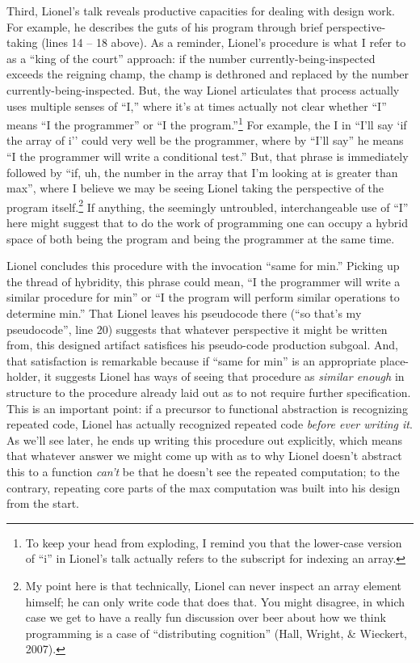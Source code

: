 Third, Lionel's talk reveals productive capacities for dealing with
design work. For example, he describes the guts of his program through
brief perspective-taking (lines 14 -- 18 above). As a reminder, Lionel's
procedure is what I refer to as a ``king of the court'' approach: if the
number currently-being-inspected exceeds the reigning champ, the champ
is dethroned and replaced by the number currently-being-inspected. But,
the way Lionel articulates that process actually uses multiple senses of
``I,'' where it's at times actually not clear whether ``I'' means ``I
the programmer'' or ``I the program.''\footnote{To keep your head from
  exploding, I remind you that the lower-case version of ``i'' in
  Lionel's talk actually refers to the subscript for indexing an array.}
For example, the I in ``I'll say `if the array of i'' could very well be
the programmer, where by ``I'll say'' he means ``I the programmer will
write a conditional test.'' But, that phrase is immediately followed by
``if, uh, the number in the array that I'm looking at is greater than
max'', where I believe we may be seeing Lionel taking the perspective of
the program itself.\footnote{My point here is that technically, Lionel
  can never inspect an array element himself; he can only write code
  that does that. You might disagree, in which case we get to have a
  really fun discussion over beer about how we think programming is a
  case of ``distributing cognition'' (Hall, Wright, \& Wieckert, 2007).}
If anything, the seemingly untroubled, interchangeable use of ``I'' here
might suggest that to do the work of programming one can occupy a hybrid
space of both being the program and being the programmer at the same
time.

Lionel concludes this procedure with the invocation ``same for min.''
Picking up the thread of hybridity, this phrase could mean, ``I the
programmer will write a similar procedure for min'' or ``I the program
will perform similar operations to determine min.'' That Lionel leaves
his pseudocode there (``so that's my pseudocode'', line 20) suggests
that whatever perspective it might be written from, this designed
artifact satisfices his pseudo-code production subgoal. And, that
satisfaction is remarkable because if ``same for min'' is an appropriate
place-holder, it suggests Lionel has ways of seeing that procedure as
\emph{similar enough} in structure to the procedure already laid out as
to not require further specification. This is an important point: if a
precursor to functional abstraction is recognizing repeated code, Lionel
has actually recognized repeated code \emph{before ever writing it}. As
we'll see later, he ends up writing this procedure out explicitly, which
means that whatever answer we might come up with as to why Lionel
doesn't abstract this to a function \emph{can't} be that he doesn't see
the repeated computation; to the contrary, repeating core parts of the
max computation was built into his design from the start.

